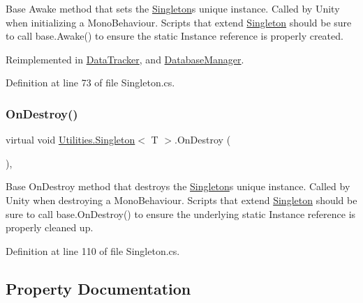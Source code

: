 Base Awake method that sets the \mbox{\hyperlink{class_utilities_1_1_singleton}{Singleton}}\textquotesingle{}s unique instance. Called by Unity when initializing a Mono\+Behaviour. Scripts that extend \mbox{\hyperlink{class_utilities_1_1_singleton}{Singleton}} should be sure to call base.\+Awake() to ensure the static Instance reference is properly created. 



Reimplemented in \mbox{\hyperlink{class_data_tracker_a683df3af0a4675dc96498519641f6c53}{Data\+Tracker}}, and \mbox{\hyperlink{class_database_manager_ab6b2a5348b157b217b1ee38a468a3167}{Database\+Manager}}.



Definition at line 73 of file Singleton.\+cs.

\mbox{\label{class_utilities_1_1_singleton_a2f20e07021a39a041e87e1a4906c77cb}} 
\subsubsection{\texorpdfstring{On\+Destroy()}{OnDestroy()}}
{\footnotesize\ttfamily virtual void \mbox{\hyperlink{class_utilities_1_1_singleton}{Utilities.\+Singleton}}$<$ T $>$.On\+Destroy (\begin{DoxyParamCaption}{ }\end{DoxyParamCaption})\hspace{0.3cm}{\ttfamily [protected]}, {\ttfamily [virtual]}}



Base On\+Destroy method that destroys the \mbox{\hyperlink{class_utilities_1_1_singleton}{Singleton}}\textquotesingle{}s unique instance. Called by Unity when destroying a Mono\+Behaviour. Scripts that extend \mbox{\hyperlink{class_utilities_1_1_singleton}{Singleton}} should be sure to call base.\+On\+Destroy() to ensure the underlying static Instance reference is properly cleaned up. 



Definition at line 110 of file Singleton.\+cs.



\subsection{Property Documentation}
\mbox{\label{class_utilities_1_1_singleton_a7b33f3dfee9e78908ad67a0b80eb3a61}} 
